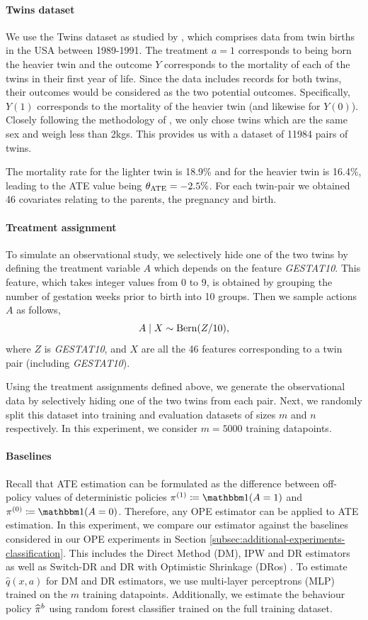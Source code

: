\paragraph{Twins dataset}
We use the Twins dataset as studied by \cite{louizos2017causal}, which comprises data from twin births in the USA between 1989-1991. The treatment $a=1$ corresponds to being born the heavier twin and the outcome $Y$ corresponds to the mortality of each of the twins in their first year of life. Since the data includes records for both twins, their outcomes would be considered as the two potential outcomes. Specifically, $Y(1)$ corresponds to the mortality of the heavier twin (and likewise for $Y(0)$). Closely following the methodology of \cite{louizos2017causal}, we only chose twins which are the same sex and weigh less than 2kgs. This provides us with a dataset of 11984 pairs of twins. 

The mortality rate for the lighter twin is 18.9\% and for the heavier twin is 16.4\%, leading to the ATE value being $\theta_{\textup{ATE}} = -2.5\%$. For each twin-pair we obtained 46 covariates relating to the parents, the pregnancy and birth. 

\paragraph{Treatment assignment}
To simulate an observational study, we selectively hide one of the two twins by defining the treatment variable $A$ which depends on the feature \emph{GESTAT10}. This feature, which takes integer values from 0 to 9, is obtained by grouping the number of gestation weeks prior to birth into 10 groups.
Then we sample actions $A$ as follows, 
\[
A \mid X \sim \textup{Bern}(Z/10),
\]
where $Z$ is \emph{GESTAT10}, and $X$ are all the 46 features corresponding to a twin pair (including \emph{GESTAT10}). 

Using the treatment assignments defined above, we generate the observational data by selectively hiding one of the two twins from each pair. Next, we randomly split this dataset into training and evaluation datasets of sizes $m$ and $n$ respectively. In this experiment, we consider $m=5000$ training datapoints. 

\paragraph{Baselines}
Recall that ATE estimation can be formulated as the difference between off-policy values of deterministic policies $\pi^{(1)} \coloneqq \ind(A=1)$ and $\pi^{(0)} \coloneqq \ind(A=0)$. Therefore, any OPE estimator can be applied to ATE estimation. In this experiment, we compare our estimator against the baselines considered in our OPE experiments in Section \ref{subsec:additional-experiments-classification}. This includes the Direct Method (DM), IPW and DR estimators as well as Switch-DR \citep{wang2017optimal} and DR with Optimistic Shrinkage (DRos) \citep{su2020doubly}. To estimate $\hat{q}(x, a)$ for DM and DR estimators, we use multi-layer perceptrons (MLP) trained on the $m$ training datapoints. Additionally, we estimate the behaviour policy $\widehat{\pi}^b$ using random forest classifier trained on the full training dataset. 

